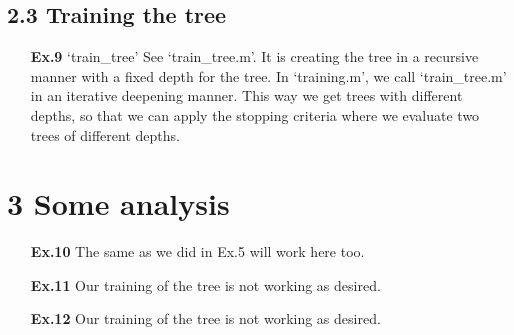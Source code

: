 \documentclass[a4paper]{article}
\begin{document}
\subsection*{2.3 Training the tree}
\begin{enumerate}
	\item[ \textbf{Ex.9} ]	`train\_tree'
	See `train\_tree.m'. It is creating the tree in a recursive manner with a fixed depth for the tree. \newline
	In `training.m', we call `train\_tree.m' in an iterative deepening manner. This way we get trees with different depths, so that we can apply the stopping criteria where we evaluate two trees of different depths.
	
\end{enumerate}


\section*{3 Some analysis}
	\begin{enumerate}
		\item[ \textbf{Ex.10} ]
		  The same as we did in Ex.5 will work here too.
		  
		\item[ \textbf{Ex.11} ] Our training of the tree is not working as desired.
		
	    \item[ \textbf{Ex.12} ] Our training of the tree is not working as desired.
	    
	\end{enumerate}
\end{document}
